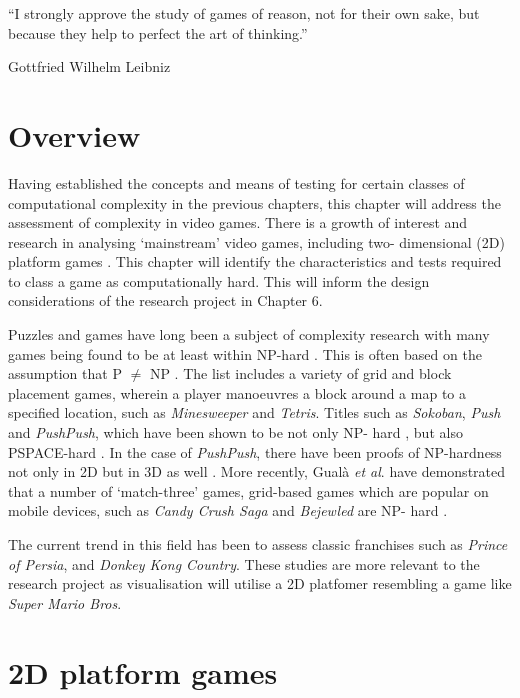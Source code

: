 \documentclass[11pt, a4paper, oneside]{report} %
\begin{document}
\epigraph{``I strongly approve the study of games of reason, not for their own
sake, but because they help to perfect the art of thinking.''}{Gottfried
Wilhelm Leibniz}

\section{Overview}

Having established the concepts and means of testing for certain classes of
computational complexity in the previous chapters, this chapter will address the
assessment of complexity in video games. There is a growth of interest and
research in analysing `mainstream' video games, including two- dimensional (2D)
platform games  \cite{viglietta2014gaming, DBLP:conf/fun/Forisek10, Aloupis2012,
Smith:2008:FAP:1401843.1401858}. This chapter will identify the characteristics
and tests required to class a game as computationally hard. This will inform the
design considerations of the research project in Chapter 6.

Puzzles and games have long been a subject of complexity research with many
games being found to be at least within NP-hard \cite{kendall2008survey}. This
is often based on the assumption that P $\neq$ NP \cite{demaine2001playing}. The
list includes a variety of grid and block placement games, wherein a player
manoeuvres a block around a map to a specified location, such as
\textit{Minesweeper}\cite{kaye2000minesweeper} and
\textit{Tetris}\cite{demaine2003tetris}. Titles such as \textit{Sokoban},
\textit{Push} and \textit{PushPush}, which have been shown to be not only NP-
hard \cite{demaine2000pushpush}, but also PSPACE-hard
\cite{culberson1999sokoban, dor1999sokoban}. In the case of \textit{PushPush},
there have been proofs of NP-hardness not only in 2D but in 3D as well
\cite{o1999pushpush}. More recently, Gual\`{a} \textit{et al}. have demonstrated
that a number of `match-three' games, grid-based games which are popular on
mobile devices, such as \textit{Candy Crush Saga} and \textit{Bejewled} are NP-
hard \cite{DBLP:journals/corr/GualaLN14}.

The current trend in this field has been to assess classic franchises such as
\textit{Prince of Persia}, and \textit{Donkey Kong Country}. These studies are
more relevant to the research project as visualisation will utilise a 2D
platfomer resembling a game like \textit{Super Mario Bros}.


\section{2D platform games}
\end{document}
